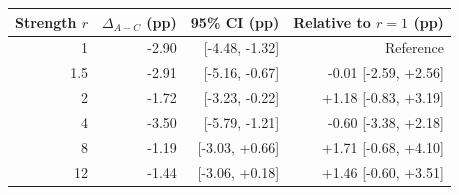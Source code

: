 \begin{tabular}{rrrr}
\toprule
Strength $r$ & $\Delta_{A-C}$ (pp) & 95\% CI (pp) & Relative to $r=1$ (pp) \\
\midrule
1 & -2.90 & [-4.48, -1.32] & Reference \\
1.5 & -2.91 & [-5.16, -0.67] & -0.01 [-2.59, +2.56] \\
2 & -1.72 & [-3.23, -0.22] & +1.18 [-0.83, +3.19] \\
4 & -3.50 & [-5.79, -1.21] & -0.60 [-3.38, +2.18] \\
8 & -1.19 & [-3.03, +0.66] & +1.71 [-0.68, +4.10] \\
12 & -1.44 & [-3.06, +0.18] & +1.46 [-0.60, +3.51] \\
\bottomrule
\end{tabular}
